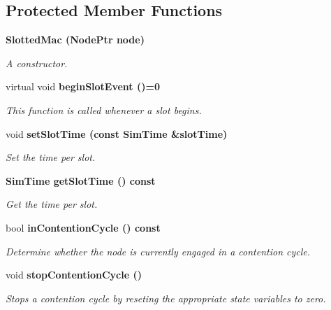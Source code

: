 \subsection*{Protected Member Functions}
\begin{CompactItemize}
\item 
\bf{Slotted\-Mac} (Node\-Ptr node)\label{classSlottedMac_a5727fe1eaa8d981c02b7870e0bf2fd5}

\begin{CompactList}\small\item\em A constructor. \item\end{CompactList}\item 
virtual void \bf{begin\-Slot\-Event} ()=0\label{classSlottedMac_aac32b0a42282f4e2d694200cb392045}

\begin{CompactList}\small\item\em This function is called whenever a slot begins. \item\end{CompactList}\item 
void \bf{set\-Slot\-Time} (const \bf{Sim\-Time} \&slot\-Time)
\begin{CompactList}\small\item\em Set the time per slot. \item\end{CompactList}\item 
\bf{Sim\-Time} \bf{get\-Slot\-Time} () const 
\begin{CompactList}\small\item\em Get the time per slot. \item\end{CompactList}\item 
bool \bf{in\-Contention\-Cycle} () const 
\begin{CompactList}\small\item\em Determine whether the node is currently engaged in a contention cycle. \item\end{CompactList}\item 
void \bf{stop\-Contention\-Cycle} ()\label{classSlottedMac_143047c6cae0fdc6b6d15e9ccdb7c048}

\begin{CompactList}\small\item\em Stops a contention cycle by reseting the appropriate state variables to zero. \item\end{CompactList}\end{CompactItemize}
